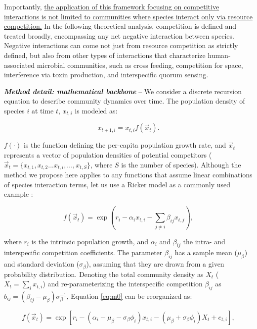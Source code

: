 \documentclass[12pt, class=article, crop=false]{standalone}
\begin{document}
Importantly, \ul{the application of this framework focusing on competitive interactions is not limited to communities where species interact only via resource competition.}
In the following theoretical analysis, competition is defined and treated broadly, encompassing any net negative interaction between species.
Negative interactions can come not just from resource competition as strictly defined, but also from other types of interactions that characterize human-associated microbial communities, such as cross feeding, competition for space, interference via toxin production, and interspecific quorum sensing.

\textbf{\textit{Method detail: mathematical backbone}} -- 
We consider a discrete recursion equation to describe community dynamics over time. The population density of species $i$ at time $t$, $x_{t,i}$ is modeled as:

\begin{equation}
\label{eq:m0}
x_{t + 1, i} = x_{t, i} f(\overset{\rightarrow}{x}_{t}).
\end{equation}

$f(\cdot)$ is the function defining the per-capita population growth rate, and $\overset{\rightarrow}{x}_{t}$ represents a vector of population densities of potential competitors ($\overset{\rightarrow}{x}_{t} = \{x_{t,1}, x_{t,2}...x_{t,i},...,x_{t,S}\}$, where $S$ is the number of species).
Although the method we propose here applies to any functions that assume linear combinations of species interaction terms, let us use a Ricker model as a commonly used example \citep{ricker_stock_1954, fowler_species_2012, terui_intentional_2023}:

\begin{equation}
\label{eq:ricker}
f(\overset{\rightarrow}{x}_{t}) = \exp(r_i - \alpha_i x_{t,i} - \sum_{j \ne i} \beta_{ij} x_{t,j}),
\end{equation}

where $r_i$ is the intrinsic population growth, and $\alpha_{i}$ and $\beta_{ij}$ the intra- and interspecific competition coefficients.
The parameter $\beta_{ij}$ has a sample mean ($\mu_{\beta}$) and standard deviation ($\sigma_{\beta}$), assuming that they are drawn from a given probability distribution. 
Denoting the total community density as $X_t$ ($X_t = \sum_i x_{t,i}$) and re-parameterizing the interspecific competition $\beta_{ij}$ as $b_{ij} = (\beta_{ij} - \mu_{\beta}) \sigma_{\beta}^{-1}$, Equation \ref{eq:m0} can be reorganized as:

\begin{equation}
\label{eq:rickermod0}
f(\overset{\rightarrow}{x}_{t}) = \exp\left[r_i - (\alpha_i - \mu_{\beta} - \sigma_{\beta} \phi_i) x_{t,i} - (\mu_{\beta} +  \sigma_{\beta} \phi_i) X_t + e_{t,i} \right],
\end{equation}
\end{document}
